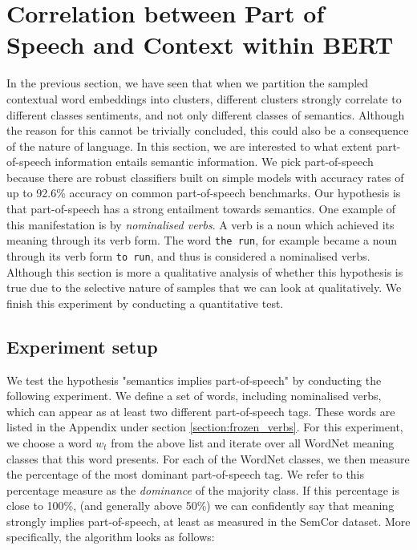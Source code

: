 \documentclass[a4paper,12pt,oneside,openright]{report}
\begin{document}
\section{Correlation between Part of Speech and Context within BERT} \label{correlation_pos_context}

In the previous section, we have seen that when we partition the sampled contextual word embeddings into clusters, different clusters strongly correlate to different classes sentiments, and not only different classes of semantics.
Although the reason for this cannot be trivially concluded, this could also be a consequence of the nature of language.
In this section, we are interested to what extent part-of-speech information entails semantic information.
We pick part-of-speech because there are robust classifiers built on simple models with accuracy rates of up to 92.6\% accuracy on common part-of-speech benchmarks.
Our hypothesis is that part-of-speech has a strong entailment towards semantics.
One example of this manifestation is by \textit{nominalised verbs}.
A  verb is a noun which achieved its meaning through its verb form.
The word \Verb#the run#, for example became a noun through its verb form \Verb#to run#, and thus is considered a nominalised verbs.
Although this section is more a qualitative analysis of whether this hypothesis is true due to the selective nature of samples that we can look at qualitatively.
We finish this experiment by conducting a quantitative test.

\subsection{Experiment setup}

We test the hypothesis "semantics implies part-of-speech" by conducting the following experiment.
We define a set of words, including nominalised verbs, which can appear as at least two different part-of-speech tags.
These words are listed in the Appendix under section \eqref{section:frozen_verbs}.
For this experiment, we choose a word $w_t$ from the above list and iterate over all WordNet meaning classes that this word presents.
For each of the WordNet classes, we then measure the percentage of the most dominant part-of-speech tag.
We refer to this percentage measure as the \textit{dominance} of the majority class.
If this percentage is close to 100\%, (and generally above 50\%) we can confidently say that meaning strongly implies part-of-speech, at least as measured in the SemCor dataset.
More specifically, the algorithm looks as follows:
\end{document}
